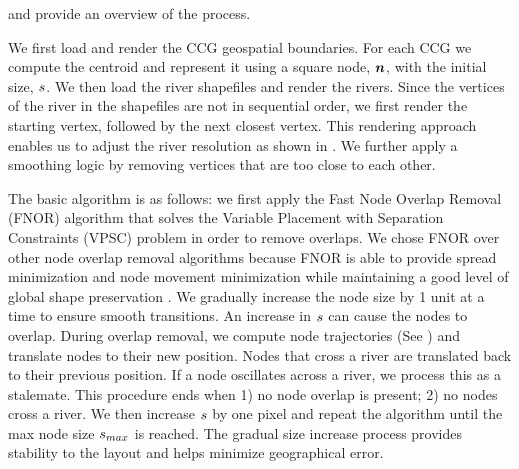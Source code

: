  and  provide an overview of the process.

 We first load and render the CCG geospatial boundaries. For each CCG we compute the centroid and represent it using a square node, $ \bm{n} $, with the initial size, $ s $. We then load the river shapefiles and render the rivers. Since the vertices of the river in the shapefiles are not in sequential order, we first render the starting vertex, followed by the next closest vertex. This rendering approach enables us to adjust the river resolution as shown in . We further apply a smoothing logic by removing vertices that are too close to each other.

 The basic algorithm is as follows: we first apply the Fast Node Overlap Removal (FNOR) algorithm that solves the Variable Placement with Separation Constraints (VPSC) problem \cite{dwyer2006fast} in order to remove overlaps. We chose FNOR over other node overlap removal algorithms because FNOR is able to provide spread minimization and node movement minimization while maintaining a good level of global shape preservation \cite{chen2020Node}. We gradually increase the node size by 1 unit at a time to ensure smooth transitions. An increase in $ s $ can cause the nodes to overlap. During overlap removal, we compute node trajectories (See ) and translate nodes to their new position. Nodes that cross a river are translated back to their previous position. If a node oscillates across a river, we process this as a stalemate. This procedure ends when 1) no node overlap is present; 2) no nodes cross a river. We then increase $ s $ by one pixel and repeat the algorithm until the max node size $ s_{max} $ is reached. The gradual size increase process provides stability to the layout and helps minimize geographical error.



